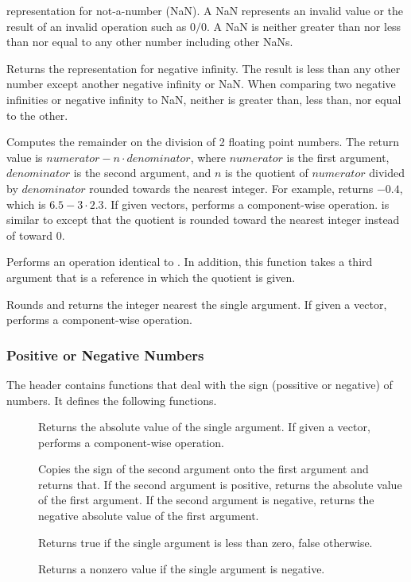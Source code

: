 \begin{description}
  representation for not-a-number (NaN). A NaN represents an invalid value
  or the result of an invalid operation such as $0/0$. A NaN is neither
  greater than nor less than nor equal to any other number including other
  NaNs.
\item[\daxmath{NegativeInfinity}] Returns the  representation
  for negative infinity. The result is less than any other number except
  another negative infinity or NaN. When comparing two negative infinities
  or negative infinity to NaN, neither is greater than, less than, nor
  equal to the other.
\item[\daxmath{Remainder}]  Computes the remainder on the
  division of 2 floating point numbers. The return value is $numerator - n
  \cdot denominator$, where $numerator$ is the first argument,
  $denominator$ is the second argument, and $n$ is the quotient of
  $numerator$ divided by $denominator$ rounded towards the nearest
  integer. For example,  returns
  $-0.4$, which is $6.5 - 3\cdot2.3$. If given vectors,
   performs a component-wise
  operation.  is similar to 
  except that the quotient is rounded toward the nearest integer instead of
  toward 0.
\item[\daxmath{RemainderQuotient}] Performs an operation identical to
  . In addition, this function takes a third
  argument that is a reference in which the quotient is given.
\item[\daxmath{Round}] Rounds and returns the integer nearest the single
  argument. If given a vector, performs a component-wise operation.
\end{description}

\subsubsection{Positive or Negative Numbers}

The  header contains functions that deal with
the sign (possitive or negative) of numbers. It defines the following
functions.

\begin{description}
\item[]  Returns the absolute value of
  the single argument. If given a vector, performs a component-wise
  operation.
\item[] Copies the sign of the second argument onto the
  first argument and returns that. If the second argument is positive,
  returns the absolute value of the first argument. If the second argument
  is negative, returns the negative absolute value of the first argument.
\item[]  Returns true if the single
  argument is less than zero, false otherwise.
\item[] Returns a nonzero value if the single argument is
  negative.
\end{description}

